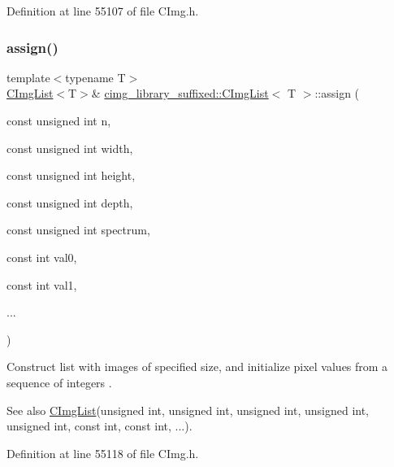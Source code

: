 Definition at line 55107 of file C\+Img.\+h.

\mbox{\label{structcimg__library__suffixed_1_1CImgList_aa11963ba03b788a1a1a336893ed7ea7d}} 
\subsubsection{\texorpdfstring{assign()}{assign()}\hspace{0.1cm}{\footnotesize\ttfamily [5/18]}}
{\footnotesize\ttfamily template$<$typename T$>$ \\
\hyperlink{structcimg__library__suffixed_1_1CImgList}{C\+Img\+List}$<$T$>$\& \hyperlink{structcimg__library__suffixed_1_1CImgList}{cimg\+\_\+library\+\_\+suffixed\+::\+C\+Img\+List}$<$ T $>$\+::assign (\begin{DoxyParamCaption}\item[{const unsigned int}]{n,  }\item[{const unsigned int}]{width,  }\item[{const unsigned int}]{height,  }\item[{const unsigned int}]{depth,  }\item[{const unsigned int}]{spectrum,  }\item[{const int}]{val0,  }\item[{const int}]{val1,  }\item[{}]{... }\end{DoxyParamCaption})\hspace{0.3cm}{\ttfamily [inline]}}



Construct list with images of specified size, and initialize pixel values from a sequence of integers . 

\begin{DoxySeeAlso}{See also}
\hyperlink{structcimg__library__suffixed_1_1CImgList}{C\+Img\+List}(unsigned int, unsigned int, unsigned int, unsigned int, unsigned int, const int, const int, ...). 
\end{DoxySeeAlso}


Definition at line 55118 of file C\+Img.\+h.

\mbox{\label{structcimg__library__suffixed_1_1CImgList_a0ced7de4776d986e08470f68921831f4}} 
